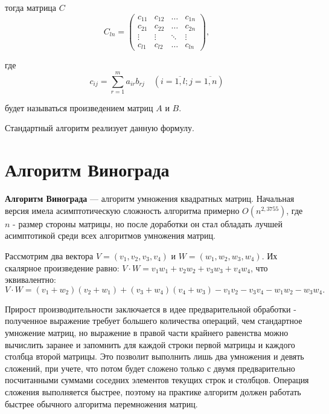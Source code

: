 тогда матрица $C$
\begin{equation}
	C_{ln} = \begin{pmatrix}
		c_{11} & c_{12} & \ldots & c_{1n}\\
		c_{21} & c_{22} & \ldots & c_{2n}\\
		\vdots & \vdots & \ddots & \vdots\\
		c_{l1} & c_{l2} & \ldots & c_{ln}
	\end{pmatrix},
\end{equation}

где
\begin{equation}
	\label{eq:M}
	c_{ij} =
	\sum_{r=1}^{m} a_{ir}b_{rj} \quad (i=\overline{1,l}; j=\overline{1,n})
\end{equation}

будет называться произведением матриц $A$ и $B$.

Стандартный алгоритм реализует данную формулу.


\section{Алгоритм Винограда}

\textbf{Алгоритм Винограда} \cite{vinograd-matrix} — алгоритм умножения квадратных матриц. Начальная версия имела асимптотическую сложность алгоритма примерно $O(n^{2,3755})$, где $n$ - размер стороны матрицы, но после доработки он стал обладать лучшей асимптотикой среди всех алгоритмов умножения матриц.

Рассмотрим два вектора $V = (v_1, v_2, v_3, v_4)$ и $W = (w_1, w_2, w_3, w_4)$.
Их скалярное произведение равно: $V \cdot W = v_1w_1 + v_2w_2 + v_3w_3 + v_4w_4$, что эквивалентно:
\begin{equation}
	\label{for:new}
	V \cdot W = (v_1 + w_2)(v_2 + w_1) + (v_3 + w_4)(v_4 + w_3) - v_1v_2 - v_3v_4 - w_1w_2 - w_3w_4.
\end{equation}

Прирост производительности заключается в идее предварительной обработки - полученное выражение требует большего количества операций, чем стандартное умножение матриц, но выражение в правой части крайнего равенства можно вычислить заранее и запомнить для каждой строки первой матрицы и каждого столбца второй матрицы. 
Это позволит выполнить лишь два умножения и девять сложений, при учете, что потом будет сложено только с двумя предварительно посчитанными суммами соседних элементов текущих строк и столбцов. Операция сложения выполняется быстрее, поэтому на практике алгоритм должен работать быстрее обычного алгоритма перемножения матриц.

